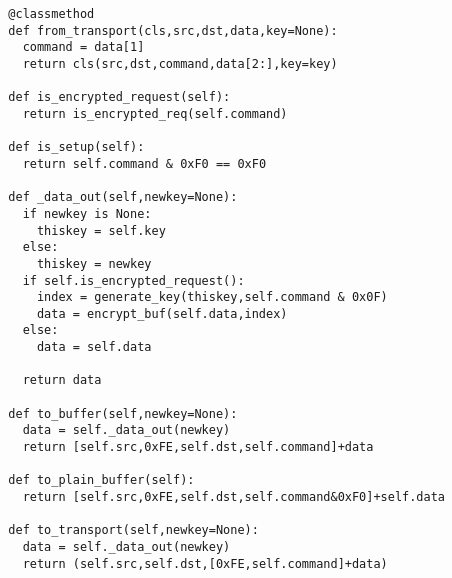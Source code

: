 \begin{verbatim}
  @classmethod
  def from_transport(cls,src,dst,data,key=None):
    command = data[1]
    return cls(src,dst,command,data[2:],key=key)

  def is_encrypted_request(self):
    return is_encrypted_req(self.command)

  def is_setup(self):
    return self.command & 0xF0 == 0xF0

  def _data_out(self,newkey=None):
    if newkey is None:
      thiskey = self.key
    else:
      thiskey = newkey
    if self.is_encrypted_request():
      index = generate_key(thiskey,self.command & 0x0F)
      data = encrypt_buf(self.data,index)
    else:
      data = self.data

    return data

  def to_buffer(self,newkey=None):
    data = self._data_out(newkey)
    return [self.src,0xFE,self.dst,self.command]+data

  def to_plain_buffer(self):
    return [self.src,0xFE,self.dst,self.command&0xF0]+self.data

  def to_transport(self,newkey=None):
    data = self._data_out(newkey)
    return (self.src,self.dst,[0xFE,self.command]+data)






\end{verbatim}


